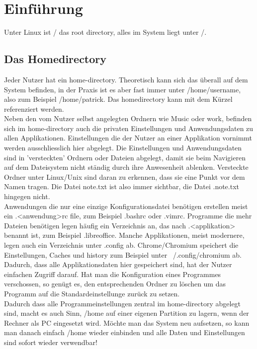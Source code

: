 \section{Einf\"uhrung}
Unter Linux ist / das root directory, alles im System liegt unter /.\\
\subsection{Das Homedirectory}
Jeder Nutzer hat ein home-directory. Theoretisch kann sich das \"uberall auf dem System befinden, in der Praxis ist es aber fast immer unter /home/username, also zum Beispiel /home/patrick. Das homedirectory kann mit dem K\"urzel ~ referenziert werden.\\
Neben den vom Nutzer selbst angelegten Ordnern wie Music oder work, befinden sich im home-directory auch die privaten Einstellungen und Anwendungsdaten zu allen Applikationen. Einstellungen die der Nutzer an einer Applikation vornimmt werden ausschliesslich hier abgelegt. Die Einstellungen und Anwendungsdaten sind in 'versteckten' Ordnern oder Dateien abgelegt, damit sie beim Navigieren auf dem Dateisystem nicht st\"andig durch ihre Anwesenheit ablenken. Versteckte Ordner unter Linux/Unix sind daran zu erkennen, dass sie eine Punkt vor dem Namen tragen. Die Datei note.txt ist also immer sichtbar, die Datei .note.txt hingegen nicht.\\
Anwendungen die nur eine einzige Konfigurationsdatei ben\"otigen erstellen meist ein .<anwendung>rc file, zum Beispiel .bashrc oder .vimrc. Programme die mehr Dateien ben\"otigen legen h\"aufig ein Verzeichnis an, das nach .<applikation> benannt ist, zum Beispiel .libreoffice. Manche Applikationen, meist modernere, legen auch ein Verzeichnis unter .config ab. Chrome/Chromium speichert die Einstellungen, Caches und history zum Beispiel unter ~/.config/chromium ab.\\
Dadurch, dass alle Applikationsdaten hier gespeichert sind, hat der Nutzer einfachen Zugriff darauf. Hat man die Konfiguration eines Programmes verschossen, so gen\"ugt es, den entsprechenden Ordner zu l\"oschen um das Programm auf die Standardeinstellunge zur\"uck zu setzen.\\
Dadurch dass alle Programmeinstellungen zentral im home-directory abgelegt sind, macht es auch Sinn, /home auf einer eigenen Partition zu lagern, wenn der Rechner als PC eingesetzt wird. M\"ochte man das System neu aufsetzen, so kann man danach einfach /home wieder einbinden und alle Daten und Einstellungen sind sofort wieder verwendbar!
